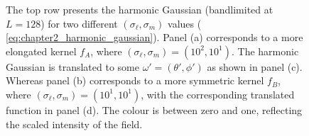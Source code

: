 \begin{figure}[htp]
	\caption{
		The top row presents the harmonic Gaussian (bandlimited at \(L=128\)) for two different \((\sigma_{\ell},\sigma_{m})\) values (\cf{} \cref{eq:chapter2_harmonic_gaussian}).
		Panel (a) corresponds to a more elongated kernel \(f_{A}\), where \((\sigma_{\ell},\sigma_{m}) = (10^{2},10^{1})\).
		The harmonic Gaussian is translated to some \(\omega'=(\theta',\phi')\) as shown in panel (c).
		Whereas panel (b) corresponds to a more symmetric kernel \(f_{B}\), where \((\sigma_{\ell},\sigma_{m}) = (10^{1},10^{1})\), with the corresponding translated function in panel (d).
		The colour is between zero and one, reflecting the scaled intensity of the field.
	}\label{fig:chapter2_harmonic_gaussian}
\end{figure}
